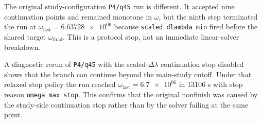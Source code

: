The original study-configuration \texttt{P4/q45} run is different. It accepted nine continuation points and remained monotone in \(\omega\), but the ninth step terminated the run at \(\omega_{\mathrm{last}} = \num{6.63728e+06}\) because \texttt{scaled dlambda min} fired before the shared target \(\omega_{\mathrm{final}}\). This is a protocol stop, not an immediate linear-solver breakdown.

A diagnostic rerun of \texttt{P4/q45} with the scaled-\(\Delta\lambda\) continuation stop disabled shows that the branch can continue beyond the main-study cutoff. Under that relaxed stop policy the run reached \(\omega_{\mathrm{last}} = \num{6.7e+06}\) in \num{13106} s with stop reason \texttt{omega max stop}. This confirms that the original nonfinish was caused by the study-side continuation stop rather than by the solver failing at the same point.

